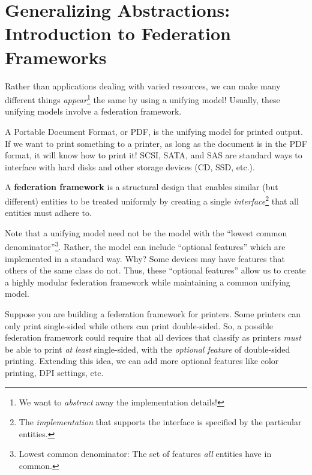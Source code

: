 \documentclass{report}
\begin{document}
\section{Generalizing Abstractions: Introduction to Federation Frameworks}
\label{sec:FF}
Rather than applications dealing with varied resources, we can make many different things
\textit{appear}\footnote{We want to \textit{abstract} away the implementation details!} the same by
using a unifying model! Usually, these unifying models involve a federation framework.

\begin{tcolorbox}[colback=blue!5!white,colframe=black!75!blue,title=Example: Computer Communism] 
  A Portable Document Format, or PDF, is the unifying model for printed output. If we want to print
  something to a printer, as long as the document is in the PDF format, it will know how to print it!
  \tcblower
  SCSI, SATA, and SAS are standard ways to interface with hard disks and other storage devices (CD,
  SSD, etc.).
\end{tcolorbox}

\begin{tcolorbox}[title=Definition: Federation Framework]
  A \textbf{federation framework} is a structural design that enables similar (but different)
  entities to be treated uniformly by creating a single \textit{interface}\footnote{The
    \textit{implementation} that supports the interface is specified by the particular entities.}
  that all entities must adhere to. 
\end{tcolorbox}

Note that a unifying model need not be the model with the ``lowest common
denominator''\footnote{Lowest common denominator: The set of features \textit{all} entities have in
  common.}. Rather, the model can include ``optional features'' which are implemented in a standard
way. Why? Some devices may have features that others of the same class do not. Thus, these
``optional features'' allow us to create a highly modular federation framework while maintaining a
common unifying model.

\begin{tcolorbox}[colback=blue!5!white,colframe=black!75!blue,title=Example: Pretty Printing] 
  Suppose you are building a federation framework for printers. Some printers can only print
  single-sided while others can print double-sided. So, a possible federation framework 
  could require that all devices that classify as printers \textit{must} be able to print \textit{at
    least} single-sided, with the \textit{optional feature} of double-sided printing. Extending this
  idea, we can add more optional features like color printing, DPI settings, etc.
\end{tcolorbox}
\end{document}
